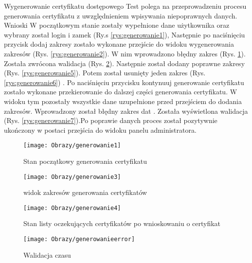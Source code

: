 \begin{enumerate*}
	\item  Wygenerowanie certyfikatu dostępowego
	Test polega na przeprowadzeniu procesu generowania certyfikatu z uwzględnieniem wpisywania niepoprawnych danych.
	Wnioski W początkowym stanie zostały wypełnione dane użytkownika oraz wybrany został login i zamek (Ry.s \ref{rys:generowanie1}), Następnie po naciśnięciu przycisk dodaj zakresy zostało wykonane przejście do widoku  wygenerowania zakresów (Rys. \ref{rys:generowanie2}). W nim wprowadzono  błędny zakres (Rys. \ref{rys:generowanie3}). Została zwrócona walidacja (Rys. \ref{rys:generowanie4}). Następnie został dodany poprawne zakresy (Rys. \ref{rys:generowanie5}). Potem został usunięty jeden zakres (Rys. \ref{rys:generowanie6})   . Po naciśnięciu przycisku kontynuuj generowanie certyfikatu zostało wykonane przekierowanie  do dalszej części generowania certyfikatu. W widoku tym pozostały wszystkie dane uzupełnione przed przejściem do dodania zakresów. Wprowadzony został błędny zakres dat . Została wyświetlona walidacja (Rys. \ref{rys:generowanie7}).Po poprawie danych proces został pozytywnie ukończony w postaci przejścia do widoku panelu administratora.
		\begin{figure}[ht!]
		
		\begin{minipage}{0.2\textwidth}
			\texttt{[image: Obrazy/generowanie1]}
			\caption{Stan początkowy generowania certyfikatu }
			\label{rys:generowanie1}
		\end{minipage}
	
		
		\begin{minipage}{0.2\textwidth}
			\texttt{[image: Obrazy/generowanie3]}
			\caption{widok zakresów generowania certyfikatów}
			\label{rys:generowanie2}
		\end{minipage}
		\begin{minipage}{0.2\textwidth}
			\texttt{[image: Obrazy/generowanie4]}
			\caption{Stan listy oczekujących certyfikatów po wnioskowaniu o certyfikat}
			\label{rys:generowanie3}
		\end{minipage}
	\end{figure}


	


	\begin{figure}[ht!]
	
		\begin{minipage}{0.2\textwidth}
		\texttt{[image: Obrazy/generowanieerror]}
		\caption{Walidacja czasu }
		\label{rys:generowanie4}
	\end{minipage}
	

\end{figure}
\end{enumerate*}
